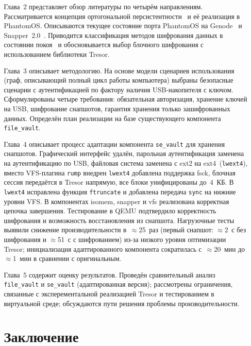 \documentclass[oneside,final,14pt,a4paper]{extreport}
\theoremstyle{definition}
\theoremstyle{remark}
\theoremstyle{remark}
\begin{document}
Глава~2 представляет обзор литературы по четырём направлениям. Рассматривается концепция ортогональной персистентности~\cite{PLA,Revisited,KOS,Aurora} и её реализация в PhantomOS. Описываются текущее состояние порта PhantomOS на Genode~\cite{Antonov_Anton} и Snapper~2.0~\cite{FOSDEM_Snapper,FOSDEM_Snapper_paper}. Приводится классификация методов шифрования данных в состоянии покоя~\cite{NIST_SP800111,CryptoFS} и обосновывается выбор блочного шифрования с использованием библиотеки Tresor.

Глава~3 описывает методологию. На основе модели сценариев использования (граф, описывающий полный цикл работы компьютера) выбраны безопасные сценарии с аутентификацией по фактору наличия USB-накопителя с ключом. Сформулированы четыре требования: обязательная авторизация, хранение ключей на USB, шифрование снапшотов, гарантия хранения только зашифрованных данных. Определён план реализации на базе существующего компонента \texttt{file\_vault}.

Глава~4 описывает процесс адаптации компонента \texttt{se\_vault} для хранения снапшотов. Графический интерфейс удалён, парольная аутентификация заменена на аутентификацию по USB, файловая система заменена с ext2 на ext4~(\texttt{lwext4}), вместо VFS-плагина \texttt{rump} внедрен \texttt{lwext4} добавлена поддержка fsck, блочная сессия передаётся в Tresor напрямую, все блоки унифицированы до~4~КБ. В \texttt{lwext4} исправлена функция \texttt{ftruncate} и добавлена передача \texttt{sync} на нижние уровни VFS. В компонентах isomem, snapper и vfs реализована корректная цепочка завершения. Тестирование в QEMU подтвердило корректность шифрования и возможность восстановления из снапшота. Нагрузочные тесты выявили снижение производительности в~$\approx$25~раз (первый снапшот: $\approx$2~с без шифрования и $\approx$51~с с шифрованием) из-за низкого уровня оптимизации Tresor; инициализация адаптированного компонента сократилась с~$\approx$20~мин до~$\approx$1~мин в сравнении с оригинальным.

Глава~5 содержит оценку результатов. Проведён сравнительный анализ \texttt{file\_vault} и \texttt{se\_vault} (адаптированная версия); рассмотрены ограничения, связанные с эксперементальной реализацией Tresor и тестированием в виртуальной среде; обсуждаются пути решения проблемы производительности.

\section{Заключение}
\end{document}
